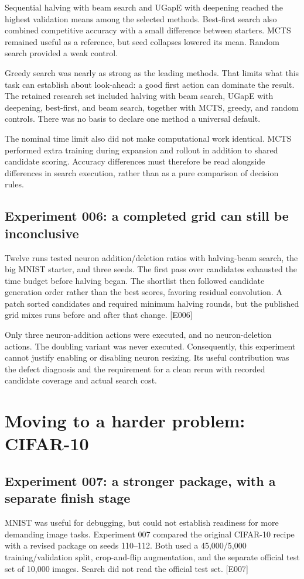 \documentclass[11pt,a4paper]{article}
\newcommand{\ev}[1]{\textcolor{ink}{\small[#1]}}
\begin{document}
Sequential halving with beam search and UGapE with deepening reached the highest validation means among the selected methods. Best-first search also combined competitive accuracy with a small difference between starters. MCTS remained useful as a reference, but seed collapses lowered its mean. Random search provided a weak control.

Greedy search was nearly as strong as the leading methods. That limits what this task can establish about look-ahead: a good first action can dominate the result. The retained research set included halving with beam search, UGapE with deepening, best-first, and beam search, together with MCTS, greedy, and random controls. There was no basis to declare one method a universal default.

The nominal time limit also did not make computational work identical. MCTS performed extra training during expansion and rollout in addition to shared candidate scoring. Accuracy differences must therefore be read alongside differences in search execution, rather than as a pure comparison of decision rules.

\subsection{Experiment 006: a completed grid can still be inconclusive}
Twelve runs tested neuron addition/deletion ratios with halving-beam search, the big MNIST starter, and three seeds. The first pass over candidates exhausted the time budget before halving began. The shortlist then followed candidate generation order rather than the best scores, favoring residual convolution. A patch sorted candidates and required minimum halving rounds, but the published grid mixes runs before and after that change. \ev{E006}

Only three neuron-addition actions were executed, and no neuron-deletion actions. The doubling variant was never executed. Consequently, this experiment cannot justify enabling or disabling neuron resizing. Its useful contribution was the defect diagnosis and the requirement for a clean rerun with recorded candidate coverage and actual search cost.

\newpage
\section{Moving to a harder problem: CIFAR-10}
\subsection{Experiment 007: a stronger package, with a separate finish stage}
MNIST was useful for debugging, but could not establish readiness for more demanding image tasks. Experiment 007 compared the original CIFAR-10 recipe with a revised package on seeds 110--112. Both used a 45,000/5,000 training/validation split, crop-and-flip augmentation, and the separate official test set of 10,000 images. Search did not read the official test set. \ev{E007}
\end{document}
